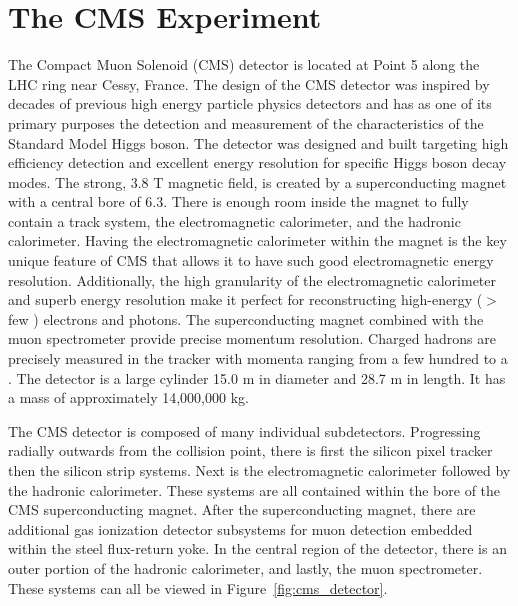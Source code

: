 \section{The CMS Experiment}
\label{sec:cms}
The Compact Muon Solenoid (CMS) detector is located at Point 5 along the LHC ring near Cessy, France. The
design of the CMS detector was inspired by decades of previous high energy particle physics detectors and has as 
one of its
primary purposes the detection and measurement of the characteristics of the Standard Model Higgs boson. The 
detector was designed and built targeting high efficiency detection and excellent energy resolution for specific Higgs 
boson decay modes. 
The strong, 3.8 T magnetic field, is created by a superconducting magnet with a central bore of 6.3\m.
There is enough room inside the magnet to fully contain a track system, the electromagnetic calorimeter, and
the hadronic calorimeter. Having the electromagnetic calorimeter within the magnet is the key unique feature of 
CMS that allows it to have such good electromagnetic energy resolution. 
Additionally, the high granularity of the electromagnetic calorimeter and superb energy
resolution make it perfect for reconstructing high-energy ($>$ few \GeV) electrons and photons. 
The superconducting magnet combined with the muon spectrometer provide precise momentum
resolution. Charged hadrons are precisely measured in the tracker with momenta ranging from a few 
hundred \MeV to a \TeV. The detector is a large
cylinder 15.0 m in diameter and 28.7 m in length. It has a mass of approximately 14,000,000 kg.

The CMS detector is composed of many individual subdetectors. Progressing radially outwards from the collision point,
there is first the silicon pixel tracker then the silicon strip systems. Next is the 
electromagnetic calorimeter followed by the hadronic calorimeter. These systems are all contained
within the bore of the CMS superconducting magnet. After the superconducting magnet, there are 
additional gas ionization detector subsystems for muon detection
embedded within the steel flux-return yoke. In the central region of the detector, there is an 
outer portion of the hadronic calorimeter, and lastly, the muon spectrometer. These systems can all be viewed in
Figure~\ref{fig:cms_detector}.

